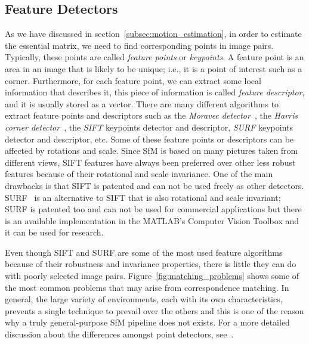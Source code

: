\subsection{Feature Detectors}
As we have discussed in section~\ref{subsec:motion_estimation}, in order to estimate
the essential matrix, we need to find corresponding points in image pairs.
Typically, these points are called \textit{feature points} or \textit{keypoints}.
%
A feature point is an area in an image that is likely to be unique; i.e., it is a point of interest such as a corner.
%
Furthermore, for each feature point, we can extract some local information that describes it, this piece of information is called \textit{feature descriptor}, and it is usually stored as a vector.
%
There are many different algorithms to extract feature points and descriptors such as the 
\emph{Moravec detector}~\cite{moravec1980obstacle}, the \emph{Harris
corner detector}~\cite{harris1988combined}, the
\emph{SIFT} keypoints detector and descriptor\cite{lowe1999object}, \emph{SURF} keypoints detector and descriptor\cite{bay2006surf}, etc.
%
Some of these feature points or descriptors can be affected by rotations and scale. Since SfM is based on many pictures taken from different views, SIFT features have always been 
preferred over other less robust features because of their rotational and scale
invariance. One of the main drawbacks is that SIFT is patented and can not be used freely as other detectors.
%
SURF~\cite{bay2006surf} is an alternative to SIFT that is also
rotational and scale invariant; SURF is patented too and 
can not be used for commercial applications but there is an available 
implementation in the MATLAB's Computer Vision Toolbox and it can be 
used for research.

Even though SIFT and SURF are some of the most used feature algorithms 
because of their robustness and invariance properties, there is little they can
do with poorly selected image pairs. Figure~\ref{fig:matching_problems} shows 
some of the most common problems that may arise from correspondence matching.
In general, the large variety of environments, each with its own characteristics, 
prevents a single technique to prevail over the others and this is one of 
the reason why a truly general-purpose SfM pipeline does not exists.
For a more detailed discussion about the differences amongst point detectors, 
see~\cite{schmidt2010evaluation, govender2009evaluation}.

